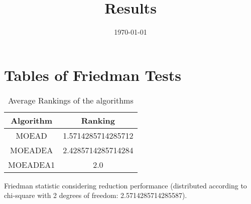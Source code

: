 \documentclass{article}
\title{Results}
\author{}
\date{\today}
\begin{document}
\oddsidemargin 0in \topmargin 0in\maketitle
\section{Tables of Friedman Tests}
\begin{table}[!htp]
\centering
\caption{Average Rankings of the algorithms
}\begin{tabular}{c|c}
Algorithm&Ranking\\
\hline
MOEAD&1.5714285714285712\\
MOEADEA&2.4285714285714284\\
MOEADEA1&2.0\\
\end{tabular}
\end{table}


Friedman statistic considering reduction performance (distributed according to chi-square with 2 degrees of freedom: 2.5714285714285587).
\end{document}
